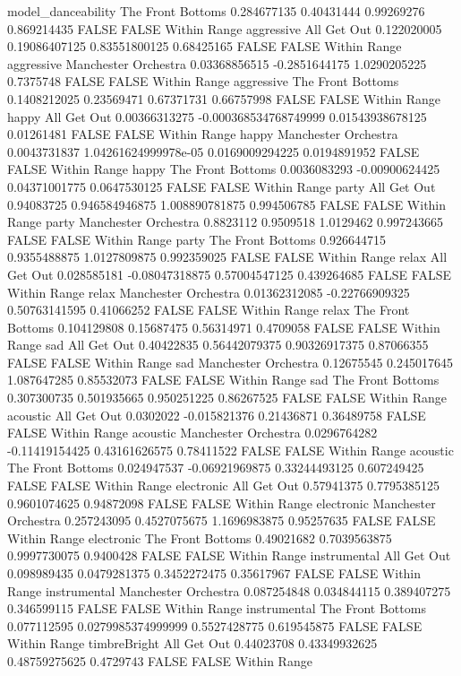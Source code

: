 model_danceability The Front Bottoms 0.284677135 0.40431444 0.99269276 0.869214435 FALSE FALSE Within Range
aggressive All Get Out 0.122020005 0.19086407125 0.83551800125 0.68425165 FALSE FALSE Within Range
aggressive Manchester Orchestra 0.03368856515 -0.2851644175 1.0290205225 0.7375748 FALSE FALSE Within Range
aggressive The Front Bottoms 0.1408212025 0.23569471 0.67371731 0.66757998 FALSE FALSE Within Range
happy All Get Out 0.00366313275 -0.000368534768749999 0.01543938678125 0.01261481 FALSE FALSE Within Range
happy Manchester Orchestra 0.0043731837 1.04261624999978e-05 0.0169009294225 0.0194891952 FALSE FALSE Within Range
happy The Front Bottoms 0.0036083293 -0.00900624425 0.04371001775 0.0647530125 FALSE FALSE Within Range
party All Get Out 0.94083725 0.946584946875 1.008890781875 0.994506785 FALSE FALSE Within Range
party Manchester Orchestra 0.8823112 0.9509518 1.0129462 0.997243665 FALSE FALSE Within Range
party The Front Bottoms 0.926644715 0.9355488875 1.0127809875 0.992359025 FALSE FALSE Within Range
relax All Get Out 0.028585181 -0.08047318875 0.57004547125 0.439264685 FALSE FALSE Within Range
relax Manchester Orchestra 0.01362312085 -0.22766909325 0.50763141595 0.41066252 FALSE FALSE Within Range
relax The Front Bottoms 0.104129808 0.15687475 0.56314971 0.4709058 FALSE FALSE Within Range
sad All Get Out 0.40422835 0.56442079375 0.90326917375 0.87066355 FALSE FALSE Within Range
sad Manchester Orchestra 0.12675545 0.245017645 1.087647285 0.85532073 FALSE FALSE Within Range
sad The Front Bottoms 0.307300735 0.501935665 0.950251225 0.86267525 FALSE FALSE Within Range
acoustic All Get Out 0.0302022 -0.015821376 0.21436871 0.36489758 FALSE FALSE Within Range
acoustic Manchester Orchestra 0.0296764282 -0.11419154425 0.43161626575 0.78411522 FALSE FALSE Within Range
acoustic The Front Bottoms 0.024947537 -0.06921969875 0.33244493125 0.607249425 FALSE FALSE Within Range
electronic All Get Out 0.57941375 0.7795385125 0.9601074625 0.94872098 FALSE FALSE Within Range
electronic Manchester Orchestra 0.257243095 0.4527075675 1.1696983875 0.95257635 FALSE FALSE Within Range
electronic The Front Bottoms 0.49021682 0.7039563875 0.9997730075 0.9400428 FALSE FALSE Within Range
instrumental All Get Out 0.098989435 0.0479281375 0.3452272475 0.35617967 FALSE FALSE Within Range
instrumental Manchester Orchestra 0.087254848 0.034844115 0.389407275 0.346599115 FALSE FALSE Within Range
instrumental The Front Bottoms 0.077112595 0.0279985374999999 0.5527428775 0.619545875 FALSE FALSE Within Range
timbreBright All Get Out 0.44023708 0.43349932625 0.48759275625 0.4729743 FALSE FALSE Within Range
